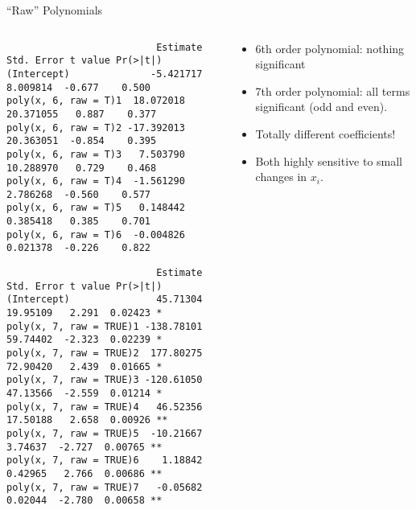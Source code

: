 \begin{frame}[fragile]{``Raw'' Polynomials}
\begin{columns}
\begin{column}{0.6\textwidth}
\tiny
\begin{verbatim}
                          Estimate Std. Error t value Pr(>|t|)
(Intercept)              -5.421717   8.009814  -0.677    0.500
poly(x, 6, raw = T)1  18.072018  20.371055   0.887    0.377
poly(x, 6, raw = T)2 -17.392013  20.363051  -0.854    0.395
poly(x, 6, raw = T)3   7.503790  10.288970   0.729    0.468
poly(x, 6, raw = T)4  -1.561290   2.786268  -0.560    0.577
poly(x, 6, raw = T)5   0.148442   0.385418   0.385    0.701
poly(x, 6, raw = T)6  -0.004826   0.021378  -0.226    0.822
\end{verbatim}

\begin{verbatim}
                          Estimate Std. Error t value Pr(>|t|)   
(Intercept)               45.71304   19.95109   2.291  0.02423 * 
poly(x, 7, raw = TRUE)1 -138.78101   59.74402  -2.323  0.02239 * 
poly(x, 7, raw = TRUE)2  177.80275   72.90420   2.439  0.01665 * 
poly(x, 7, raw = TRUE)3 -120.61050   47.13566  -2.559  0.01214 * 
poly(x, 7, raw = TRUE)4   46.52356   17.50188   2.658  0.00926 **
poly(x, 7, raw = TRUE)5  -10.21667    3.74637  -2.727  0.00765 **
poly(x, 7, raw = TRUE)6    1.18842    0.42965   2.766  0.00686 **
poly(x, 7, raw = TRUE)7   -0.05682    0.02044  -2.780  0.00658 **
\end{verbatim}
\end{column}
\begin{column}{0.4\textwidth}
\begin{itemize}
\item 6th order polynomial: nothing significant
\item 7th order polynomial: all terms significant (odd and even).
\item Totally different coefficients!
\item Both highly sensitive to small changes in $x_i$.
\end{itemize}
\end{column}
\end{columns}
\end{frame}


